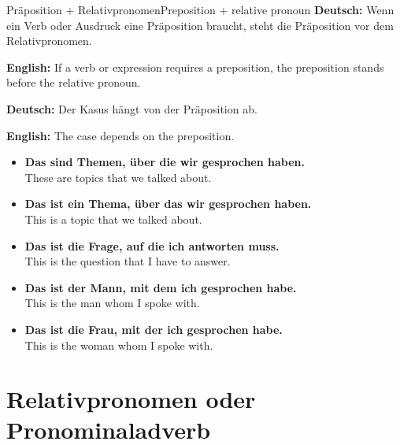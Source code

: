 \documentclass[a4paper,11pt]{article}
\newcommand{\GermanText}[1]{\textbf{Deutsch: }#1\par}
\newcommand{\EnglishText}[1]{{\small\color{SoftGray}\textbf{English: }#1\par}}
\newcommand{\ExampleItem}[2]{\item \textbf{#1}\\{\small\color{SoftGray}#2}}
\begin{document}
        \begin{grammarentry}{Präposition + Relativpronomen}{Preposition + relative pronoun}
            \GermanText{Wenn ein Verb oder Ausdruck eine Präposition braucht, steht die Präposition vor dem Relativpronomen.}
            \EnglishText{If a verb or expression requires a preposition, the preposition stands before the relative pronoun.}
            
            \GermanText{Der Kasus hängt von der Präposition ab.}
            \EnglishText{The case depends on the preposition.}
            
            \begin{exbox}
                \begin{itemize}
                    \ExampleItem{Das sind Themen, über die wir gesprochen haben.}{These are topics that we talked about.}
                    \ExampleItem{Das ist ein Thema, über das wir gesprochen haben.}{This is a topic that we talked about.}
                    \ExampleItem{Das ist die Frage, auf die ich antworten muss.}{This is the question that I have to answer.}
                    \ExampleItem{Das ist der Mann, mit dem ich gesprochen habe.}{This is the man whom I spoke with.}
                    \ExampleItem{Das ist die Frau, mit der ich gesprochen habe.}{This is the woman whom I spoke with.}
                \end{itemize}
            \end{exbox}
        \end{grammarentry}
    
    
    \section{Relativpronomen oder Pronominaladverb}
        
\end{document}
